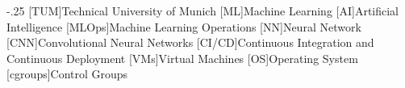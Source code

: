 \documentclass[headsepline,footsepline,footinclude=false,oneside,fontsize=11pt,paper=a4,listof=totoc,bibliography=totoc]{scrbook} %
\begin{document}


\frontmatter{}





\tableofcontents{}

\mainmatter{}







%
\appendix{}


\begin{acronym}
	\itemsep-.25\baselineskip
	[TUM]{Technical University of Munich}
	[ML]{Machine Learning}
	[AI]{Artificial Intelligence}
	[MLOps]{Machine Learning Operations}
	[NN]{Neural Network}
	[CNN]{Convolutional Neural Networks}
	[CI/CD]{Continuous Integration and Continuous Deployment}
	[VMs]{Virtual Machines}
	[OS]{Operating System}
	[cgroups]{Control Groups}
\end{acronym}

\listoffigures{}
\lstlistoflistings{}
\listoftables{}
\printbibliography{}
\end{document}

